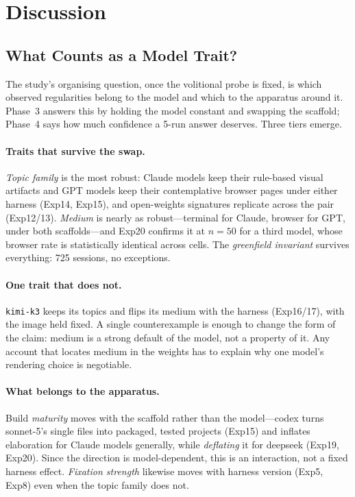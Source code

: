 \documentclass{article}
\begin{document}
\section{Discussion}
\label{sec:discussion}

\subsection{What Counts as a Model Trait?}
\label{sec:model-trait}

The study's organising question, once the volitional probe is
fixed, is which observed regularities belong to the model and
which to the apparatus around it. Phase~3 answers this by holding
the model constant and swapping the scaffold; Phase~4 says how
much confidence a 5-run answer deserves. Three tiers emerge.

\paragraph{Traits that survive the swap.} \emph{Topic family} is
the most robust: Claude models keep their rule-based visual
artifacts and GPT models keep their contemplative browser pages
under either harness (Exp14, Exp15), and open-weights signatures
replicate across the pair (Exp12/13). \emph{Medium} is nearly as
robust---terminal for Claude, browser for GPT, under both
scaffolds---and Exp20 confirms it at $n=50$ for a third model,
whose browser rate is statistically identical across cells. The
\emph{greenfield invariant} survives everything: 725 sessions, no
exceptions.

\paragraph{One trait that does not.} \texttt{kimi-k3} keeps its
topics and flips its medium with the harness (Exp16/17), with the
image held fixed. A single counterexample is enough to change the
form of the claim: medium is a strong default of the model, not a
property of it. Any account that locates medium in the weights has
to explain why one model's rendering choice is negotiable.

\paragraph{What belongs to the apparatus.} Build \emph{maturity}
moves with the scaffold rather than the model---codex turns
sonnet-5's single files into packaged, tested projects (Exp15) and
inflates elaboration for Claude models generally, while
\emph{deflating} it for deepseek (Exp19, Exp20). Since the direction
is model-dependent, this is an interaction, not a fixed harness
effect. \emph{Fixation strength} likewise moves with harness
version (Exp5, Exp8) even when the topic family does not.
\end{document}
